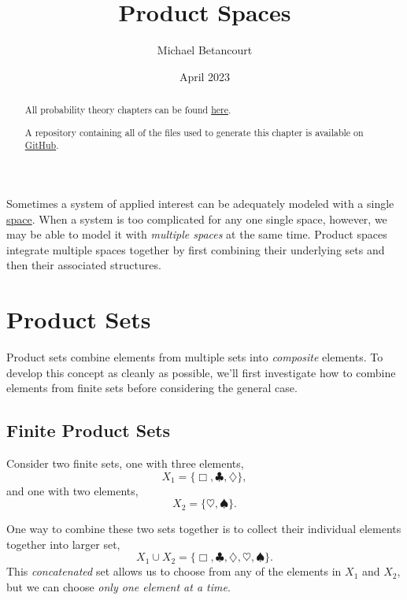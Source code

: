 \documentclass[
  letterpaper,
  DIV=11,
  numbers=noendperiod]{scrartcl}
\title{Product Spaces}
\author{Michael Betancourt}
\date{April 2023}
\renewcommand*\contentsname{Table of contents}
\newcommand\contentsname{Table of contents}
\begin{document}
\maketitle
\begin{abstract}
All probability theory chapters can be found
\href{http://www.symplectomorphic.com/writing/\#part1}{here}.

A repository containing all of the files used to generate this chapter
is available on
\href{https://github.com/betanalpha/quarto_chapters/tree/main/3_product_spaces}{GitHub}.
\end{abstract}

\renewcommand*\contentsname{Table of contents}
{
\hypersetup{linkcolor=}
\setcounter{tocdepth}{3}
\tableofcontents
}
Sometimes a system of applied interest can be adequately modeled with a
single
\href{http://www.symplectomorphic.com/assets/chapters_html/spaces.html}{space}.
When a system is too complicated for any one single space, however, we
may be able to model it with \emph{multiple spaces} at the same time.
Product spaces integrate multiple spaces together by first combining
their underlying sets and then their associated structures.

\section{Product Sets}\label{product-sets}

Product sets combine elements from multiple sets into \emph{composite}
elements. To develop this concept as cleanly as possible, we'll first
investigate how to combine elements from finite sets before considering
the general case.

\subsection{Finite Product Sets}\label{finite-product-sets}

Consider two finite sets, one with three elements, \[
X_{1} = \{ \Box, \clubsuit, \diamondsuit \},
\] and one with two elements, \[
X_{2} = \{ \heartsuit, \spadesuit \}.
\]

One way to combine these two sets together is to collect their
individual elements together into larger set, \[
X_{1} \cup X_{2}
=
\{ \Box, \clubsuit, \diamondsuit, \heartsuit, \spadesuit \}.
\] This \emph{concatenated} set allows us to choose from any of the
elements in \(X_{1}\) and \(X_{2}\), but we can choose \emph{only one
element at a time}.
\end{document}
